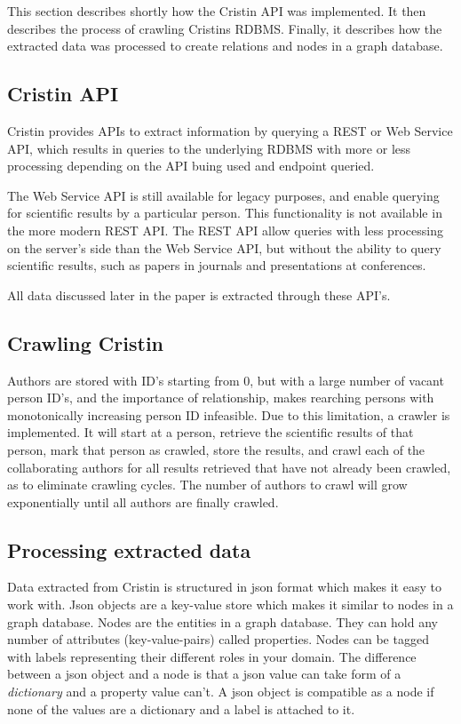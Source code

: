 This section describes shortly how the Cristin API was implemented. It then describes the process of crawling Cristins RDBMS. Finally, it describes how the extracted data was processed to create relations and nodes in a graph database.

\subsection*{Cristin API}
Cristin provides APIs to extract information by querying a REST or Web Service API, which results in queries to the underlying RDBMS with more or less processing depending on the API buing used and endpoint queried\cite{CRISTIN-API-summary}.

The Web Service API\cite{CRISTIN-WS} is still available for legacy purposes, and enable querying for scientific results by a particular person. This functionality is not available in the more modern REST API. The REST API\cite{CRISTIN-REST} allow queries with less processing on the server's side than the Web Service API, but without the ability to query scientific results, such as papers in journals and presentations at conferences.

All data discussed later in the paper is extracted through these API's.

\subsection*{Crawling Cristin}
Authors are stored with ID's starting from 0, but with a large number of vacant person ID's, and the importance of relationship, makes rearching persons with monotonically increasing person ID infeasible.
Due to this limitation, a crawler is implemented. It will start at a person, retrieve the scientific results of that person, mark that person as crawled, store the results, and crawl each of the collaborating authors for all results retrieved that have not already been crawled, as to eliminate crawling cycles.
The number of authors to crawl will grow exponentially until all authors are finally crawled.

\subsection*{Processing extracted data}
Data extracted from Cristin is structured in json format which makes it easy to work with. Json objects are a key-value store which makes it similar to nodes in a graph database. Nodes are the entities in a graph database. They can hold any number of attributes (key-value-pairs) called properties. Nodes can be tagged with labels representing their different roles in your domain.\cite{neo4j} The difference between a json object and a node is that a json value can take form of a \textit{dictionary} and a property value can't. A json object is compatible as a node if none of the values are a dictionary and a label is attached to it.

